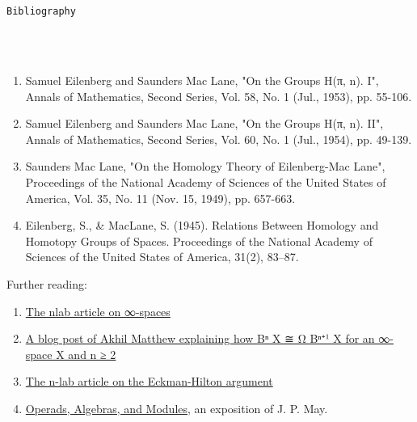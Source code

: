 \documentclass{book}
\theoremstyle{definition}
\renewcommand{\chapter}[1]{
\newpage
{
\Huge 
\begin{center}
\ \\
\ \\
\thispagestyle{empty}
\texttt{#1}
\end{center}}
\ \\
\ \\
}
\begin{document}
\newpage
\chapter{Bibliography}

\begin{enumerate}
\item Samuel Eilenberg and Saunders Mac Lane, "On the Groups H(π, n). I", Annals of Mathematics, Second Series, Vol. 58, No. 1 (Jul., 1953), pp. 55-106.
\item Samuel Eilenberg and Saunders Mac Lane, "On the Groups H(π, n). II", Annals of Mathematics, Second Series, Vol. 60, No. 1 (Jul., 1954), pp. 49-139.
\item Saunders Mac Lane, "On the Homology Theory of Eilenberg-Mac Lane", Proceedings of the National Academy of Sciences of the United States of America, Vol. 35, No. 11 (Nov. 15, 1949), pp. 657-663.
\item Eilenberg, S., \& MacLane, S. (1945). Relations Between Homology and Homotopy Groups of Spaces. Proceedings of the National Academy of Sciences of the United States of America, 31(2), 83–87. 
\end{enumerate}

Further reading:

\begin{enumerate}
\item \href{https://ncatlab.org/nlab/show/Gamma-space}{The nlab article on ∞-spaces}
\item \href{https://amathew.wordpress.com/2012/09/16/segals-infinite-loop-space-machine/}{A blog post of Akhil Matthew explaining how Bⁿ X ≅ Ω Bⁿ⁺¹ X for an ∞-space X and n ≥ 2}
\item \href{https://ncatlab.org/nlab/show/Eckmann-Hilton+argument#:~:text=In%20its%20original%20form%2C%20the,or%20Groups%20is%20necessarily%20commutative.}{The n-lab article on the Eckman-Hilton argument}
\item \href{http://www.math.uchicago.edu/~may/PAPERS/mayi.pdf}{Operads, Algebras, and Modules}, an exposition of J. P. May.
\end{enumerate}


\newpage
\ \\
\thispagestyle{empty}
\end{document}
